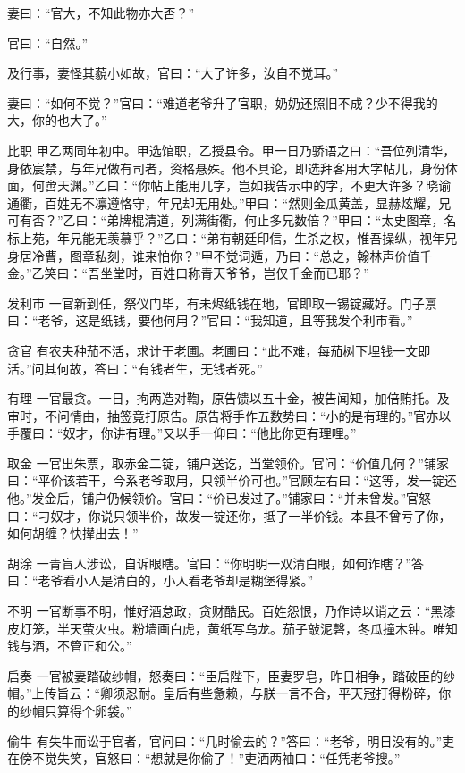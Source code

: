 \documentclass[12pt,UTF8]{ctexbook}
\begin{document}
妻曰：“官大，不知此物亦大否？”

官曰：“自然。”

及行事，妻怪其藐小如故，官曰：“大了许多，汝自不觉耳。”

妻曰：“如何不觉？”官曰：“难道老爷升了官职，奶奶还照旧不成？少不得我的大，你的也大了。”

比职
甲乙两同年初中。甲选馆职，乙授县令。甲一日乃骄语之曰：“吾位列清华，身依宸禁，与年兄做有司者，资格悬殊。他不具论，即选拜客用大字帖儿，身份体面，何啻天渊。”乙曰：“你帖上能用几字，岂如我告示中的字，不更大许多？晓谕通衢，百姓无不凛遵恪守，年兄却无用处。”甲曰：“然则金瓜黄盖，显赫炫耀，兄可有否？”乙曰：“弟牌棍清道，列满街衢，何止多兄数倍？”甲曰：“太史图章，名标上苑，年兄能无羡慕乎？”乙曰：“弟有朝廷印信，生杀之权，惟吾操纵，视年兄身居冷曹，图章私刻，谁来怕你？”甲不觉词遁，乃曰：“总之，翰林声价值千金。”乙笑曰：“吾坐堂时，百姓口称青天爷爷，岂仅千金而已耶？”

发利市
一官新到任，祭仪门毕，有未烬纸钱在地，官即取一锡锭藏好。门子禀曰：“老爷，这是纸钱，要他何用？”官曰：“我知道，且等我发个利市看。”

贪官
有农夫种茄不活，求计于老圃。老圃曰：“此不难，每茄树下埋钱一文即活。”问其何故，答曰：“有钱者生，无钱者死。”

有理
一官最贪。一日，拘两造对鞫，原告馈以五十金，被告闻知，加倍贿托。及审时，不问情由，抽签竟打原告。原告将手作五数势曰：“小的是有理的。”官亦以手覆曰：“奴才，你讲有理。”又以手一仰曰：“他比你更有理哩。”

取金
一官出朱票，取赤金二锭，铺户送讫，当堂领价。官问：“价值几何？”铺家曰：“平价该若干，今系老爷取用，只领半价可也。”官顾左右曰：“这等，发一锭还他。”发金后，铺户仍候领价。官曰：“价已发过了。”铺家曰：“并未曾发。”官怒曰：“刁奴才，你说只领半价，故发一锭还你，抵了一半价钱。本县不曾亏了你，如何胡缠？快撵出去！”

胡涂
一青盲人涉讼，自诉眼瞎。官曰：“你明明一双清白眼，如何诈瞎？”答曰：“老爷看小人是清白的，小人看老爷却是糊堡得紧。”

不明
一官断事不明，惟好酒怠政，贪财酷民。百姓怨恨，乃作诗以诮之云：“黑漆皮灯笼，半天萤火虫。粉墙画白虎，黄纸写乌龙。茄子敲泥磬，冬瓜撞木钟。唯知钱与酒，不管正和公。”

启奏
一官被妻踏破纱帽，怒奏曰：“臣启陛下，臣妻罗皂，昨日相争，踏破臣的纱帽。”上传旨云：“卿须忍耐。皇后有些惫赖，与朕一言不合，平天冠打得粉碎，你的纱帽只算得个卵袋。”

偷牛
有失牛而讼于官者，官问曰：“几时偷去的？”答曰：“老爷，明日没有的。”吏在傍不觉失笑，官怒曰：“想就是你偷了！”吏洒两袖口：“任凭老爷搜。”
\end{document}
